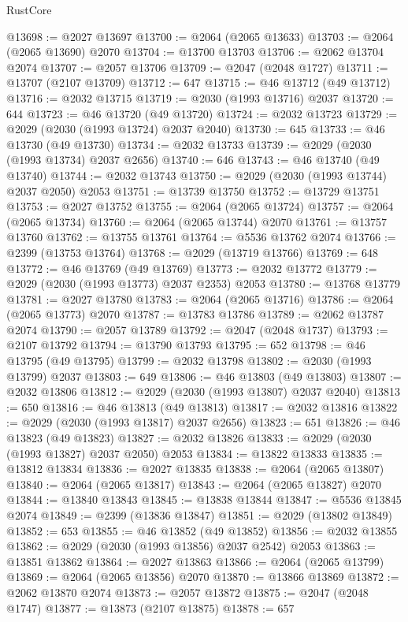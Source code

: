 \begin{lexlean}{RustCore}
\begin{coremodule}
@13698 := @2027 @13697
@13700 := @2064 (@2065 @13633)
@13703 := @2064 (@2065 @13690) @2070
@13704 := @13700 @13703
@13706 := @2062 @13704 @2074
@13707 := @2057 @13706
@13709 := @2047 (@2048 @1727)
@13711 := @13707 (@2107 @13709)
@13712 := 647
@13715 := @46 @13712 (@49 @13712)
@13716 := @2032 @13715
@13719 := @2030 (@1993 @13716) @2037
@13720 := 644
@13723 := @46 @13720 (@49 @13720)
@13724 := @2032 @13723
@13729 := @2029 (@2030 (@1993 @13724) @2037 @2040)
@13730 := 645
@13733 := @46 @13730 (@49 @13730)
@13734 := @2032 @13733
@13739 := @2029 (@2030 (@1993 @13734) @2037 @2656)
@13740 := 646
@13743 := @46 @13740 (@49 @13740)
@13744 := @2032 @13743
@13750 := @2029 (@2030 (@1993 @13744) @2037 @2050) @2053
@13751 := @13739 @13750
@13752 := @13729 @13751
@13753 := @2027 @13752
@13755 := @2064 (@2065 @13724)
@13757 := @2064 (@2065 @13734)
@13760 := @2064 (@2065 @13744) @2070
@13761 := @13757 @13760
@13762 := @13755 @13761
@13764 := @5536 @13762 @2074
@13766 := @2399 (@13753 @13764)
@13768 := @2029 (@13719 @13766)
@13769 := 648
@13772 := @46 @13769 (@49 @13769)
@13773 := @2032 @13772
@13779 := @2029 (@2030 (@1993 @13773) @2037 @2353) @2053
@13780 := @13768 @13779
@13781 := @2027 @13780
@13783 := @2064 (@2065 @13716)
@13786 := @2064 (@2065 @13773) @2070
@13787 := @13783 @13786
@13789 := @2062 @13787 @2074
@13790 := @2057 @13789
@13792 := @2047 (@2048 @1737)
@13793 := @2107 @13792
@13794 := @13790 @13793
@13795 := 652
@13798 := @46 @13795 (@49 @13795)
@13799 := @2032 @13798
@13802 := @2030 (@1993 @13799) @2037
@13803 := 649
@13806 := @46 @13803 (@49 @13803)
@13807 := @2032 @13806
@13812 := @2029 (@2030 (@1993 @13807) @2037 @2040)
@13813 := 650
@13816 := @46 @13813 (@49 @13813)
@13817 := @2032 @13816
@13822 := @2029 (@2030 (@1993 @13817) @2037 @2656)
@13823 := 651
@13826 := @46 @13823 (@49 @13823)
@13827 := @2032 @13826
@13833 := @2029 (@2030 (@1993 @13827) @2037 @2050) @2053
@13834 := @13822 @13833
@13835 := @13812 @13834
@13836 := @2027 @13835
@13838 := @2064 (@2065 @13807)
@13840 := @2064 (@2065 @13817)
@13843 := @2064 (@2065 @13827) @2070
@13844 := @13840 @13843
@13845 := @13838 @13844
@13847 := @5536 @13845 @2074
@13849 := @2399 (@13836 @13847)
@13851 := @2029 (@13802 @13849)
@13852 := 653
@13855 := @46 @13852 (@49 @13852)
@13856 := @2032 @13855
@13862 := @2029 (@2030 (@1993 @13856) @2037 @2542) @2053
@13863 := @13851 @13862
@13864 := @2027 @13863
@13866 := @2064 (@2065 @13799)
@13869 := @2064 (@2065 @13856) @2070
@13870 := @13866 @13869
@13872 := @2062 @13870 @2074
@13873 := @2057 @13872
@13875 := @2047 (@2048 @1747)
@13877 := @13873 (@2107 @13875)
@13878 := 657

\end{coremodule}
\end{lexlean}
